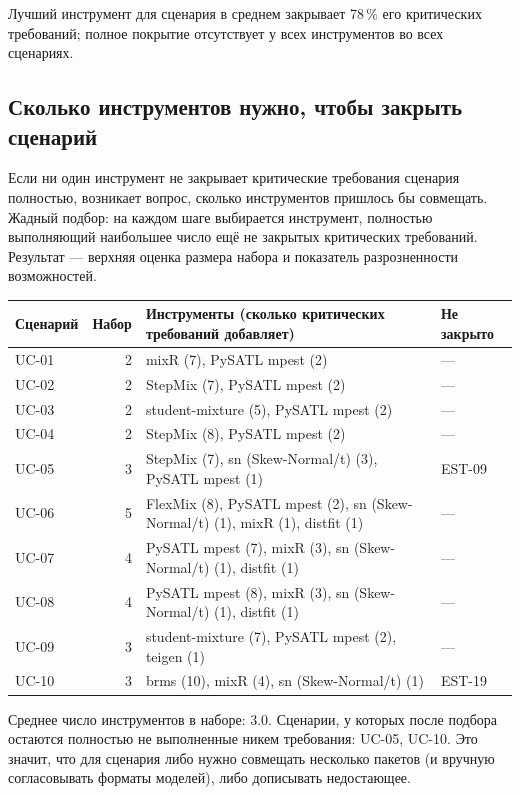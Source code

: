 \documentclass[10pt,a4paper]{article}
\begin{document}
Лучший инструмент для сценария в среднем закрывает 78\,\% его критических требований; полное покрытие отсутствует у всех инструментов во всех сценариях.

\subsection{Сколько инструментов нужно, чтобы закрыть сценарий}
Если ни один инструмент не закрывает критические требования сценария полностью, возникает вопрос, сколько инструментов пришлось бы совмещать.
Жадный подбор: на каждом шаге выбирается инструмент, полностью выполняющий наибольшее число ещё не закрытых критических требований. Результат --- верхняя оценка
размера набора и показатель разрозненности возможностей.
{\footnotesize
\begin{longtable}{@{}l r >{\raggedright\arraybackslash}p{8.8cm} >{\raggedright\arraybackslash}p{3.6cm}@{}}
\toprule
Сценарий & Набор & Инструменты (сколько критических требований добавляет) & Не закрыто \\
\midrule
\endhead
UC-01 & 2 & mixR (7), PySATL mpest (2) & --- \\
UC-02 & 2 & StepMix (7), PySATL mpest (2) & --- \\
UC-03 & 2 & student-mixture (5), PySATL mpest (2) & --- \\
UC-04 & 2 & StepMix (8), PySATL mpest (2) & --- \\
UC-05 & 3 & StepMix (7), sn (Skew-Normal/t) (3), PySATL mpest (1) & EST-09 \\
UC-06 & 5 & FlexMix (8), PySATL mpest (2), sn (Skew-Normal/t) (1), mixR (1), distfit (1) & --- \\
UC-07 & 4 & PySATL mpest (7), mixR (3), sn (Skew-Normal/t) (1), distfit (1) & --- \\
UC-08 & 4 & PySATL mpest (8), mixR (3), sn (Skew-Normal/t) (1), distfit (1) & --- \\
UC-09 & 3 & student-mixture (7), PySATL mpest (2), teigen (1) & --- \\
UC-10 & 3 & brms (10), mixR (4), sn (Skew-Normal/t) (1) & EST-19 \\
\bottomrule
\end{longtable}}
Среднее число инструментов в наборе: 3.0. Сценарии, у которых после подбора остаются полностью не выполненные никем требования:
UC-05, UC-10.
Это значит, что для сценария либо нужно совмещать несколько пакетов (и вручную согласовывать форматы моделей), либо дописывать недостающее.
\end{document}
